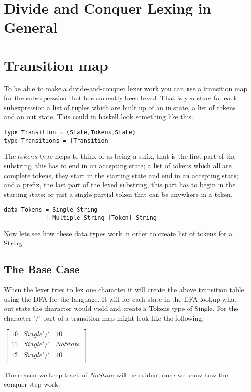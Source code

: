 \section{Divide and Conquer Lexing in General}

\section{Transition map}
To be able to make a divide-and-conquer lexer work you can use a transition map
for the subexpression that has currently been lexed. That is you store for each
subexpression a list of tuples which are built up of an in state, a list of
tokens and an out state. This could in haskell look something like this.
\begin{verbatim}
type Transition = (State,Tokens,State)
type Transitions = [Transition]
\end{verbatim}
The $tokens$ type helps to think of as being a sufix, that is the first part of
the substring, this has to end in an accepting state; a list of tokens which all
are complete tokens, they start in the starting state and end in an accepting
state; and a prefix, the last part of the lexed substring, this part has
to begin in the starting state; or just a single partial token that can be
anywhere in a token.
\begin{verbatim}
data Tokens = Single String
            | Multiple String [Token] String
\end{verbatim}
Now lets see how these data types work in order to create list of tokens for a
String.
\subsection{The Base Case}
When the lexer tries to lex one character it will create the above transition
table using the DFA for the language. It will for each state in the DFA lookup
what out state the character would yield and create a Tokens type of Single.
For the character '/' part of a transition map might look like the following.
\begin{center}
$\left[\begin{array}{ccc}
10&Single '/'&10\\
11&Single '/'&NoState\\
12&Single '/'&10\\
\end{array}\right]$
\end{center}
The reason we keep track of $NoState$ will be evident once we show how the
conquer step work.
